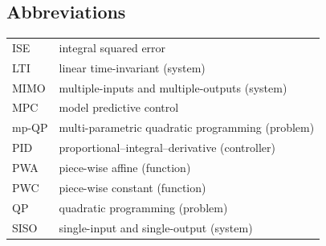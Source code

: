 \documentclass[preprint,12pt]{elsarticle}
\begin{document}
	\subsection*{Abbreviations}
		\begin{tabular}{ l l }
			ISE  & integral squared error \\
			LTI  & linear time-invariant (system) \\
			MIMO & multiple-inputs and multiple-outputs (system) \\
			MPC  & model predictive control \\
			mp-QP& multi-parametric quadratic programming (problem) \\
			PID  & proportional–integral–derivative (controller) \\
			PWA  & piece-wise affine (function) \\
			PWC  & piece-wise constant (function) \\
			QP   & quadratic programming (problem) \\
			SISO & single-input and single-output (system) \\
		\end{tabular}
	
	
	
	
	 
	
	
	
	
\end{document}
